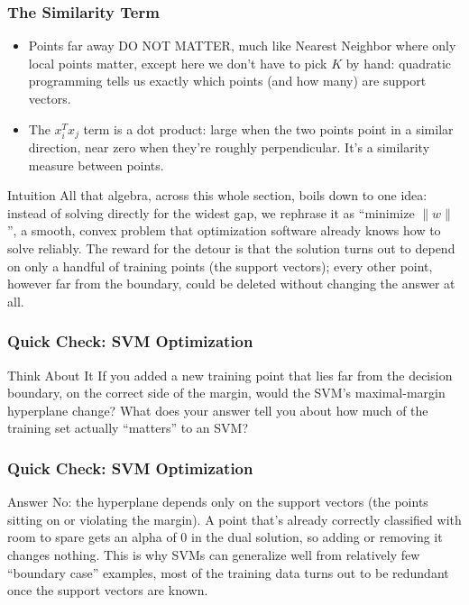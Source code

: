 \begin{frame}[fragile] \frametitle{The Similarity Term}
\begin{center}
\end{center}
\begin{itemize}
\item Points far away DO NOT MATTER, much like Nearest Neighbor where only local points matter, except here we don't have to pick $K$ by hand: quadratic programming tells us exactly which points (and how many) are support vectors.
\item The $x_i^Tx_j$ term is a dot product: large when the two points point in a similar direction, near zero when they're roughly perpendicular. It's a similarity measure between points.
\end{itemize}

\begin{block}{Intuition}
All that algebra, across this whole section, boils down to one idea: instead of solving
directly for the widest gap, we rephrase it as ``minimize $\|w\|$'', a smooth, convex problem
that optimization software already knows how to solve reliably. The reward for the detour is
that the solution turns out to depend on only a handful of training points (the support
vectors); every other point, however far from the boundary, could be deleted without changing
the answer at all.
\end{block}
\end{frame}

\begin{frame}[fragile]\frametitle{Quick Check: SVM Optimization}
\begin{block}{Think About It}
If you added a new training point that lies far from the decision boundary, on the correct
side of the margin, would the SVM's maximal-margin hyperplane change? What does your answer
tell you about how much of the training set actually ``matters'' to an SVM?
\end{block}
\end{frame}

\begin{frame}[fragile]\frametitle{Quick Check: SVM Optimization}
\begin{block}{Answer}
No: the hyperplane depends only on the support vectors (the points sitting on or violating
the margin). A point that's already correctly classified with room to spare gets an alpha of
0 in the dual solution, so adding or removing it changes nothing. This is why SVMs can
generalize well from relatively few ``boundary case'' examples, most of the training data
turns out to be redundant once the support vectors are known.
\end{block}
\end{frame}


